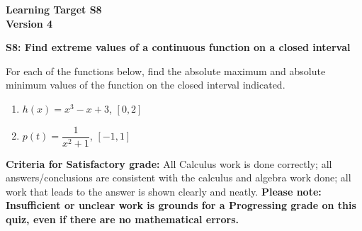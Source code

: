 \documentclass[10pt]{article}
\begin{document}
	\vspace*{0in}

		\begin{center}
			\textbf{Learning Target S8 \\
			Version 4} 
		\end{center}


\begin{framed}
	\textbf{S8: Find extreme values of a continuous function on a closed interval}
\end{framed}

For each of the functions below, find the absolute maximum and absolute minimum values of the function on the closed interval indicated. 



\begin{enumerate}
    \item $h(x) = x^3 - x + 3$, $[0,2]$
    \item $p(t) = \dfrac{1}{x^2 + 1}$, $[-1,1]$
\end{enumerate}

\vfill

\begin{small}
    \begin{framed}
        	\textbf{Criteria for Satisfactory grade:} All Calculus work is done correctly; all answers/conclusions are consistent with the calculus and algebra work done; all work that leads to the answer is shown clearly and neatly. \textbf{Please note: Insufficient or unclear work is grounds for a Progressing grade on this quiz, even if there are no mathematical errors.}
    \end{framed}

\end{small}
\end{document}
